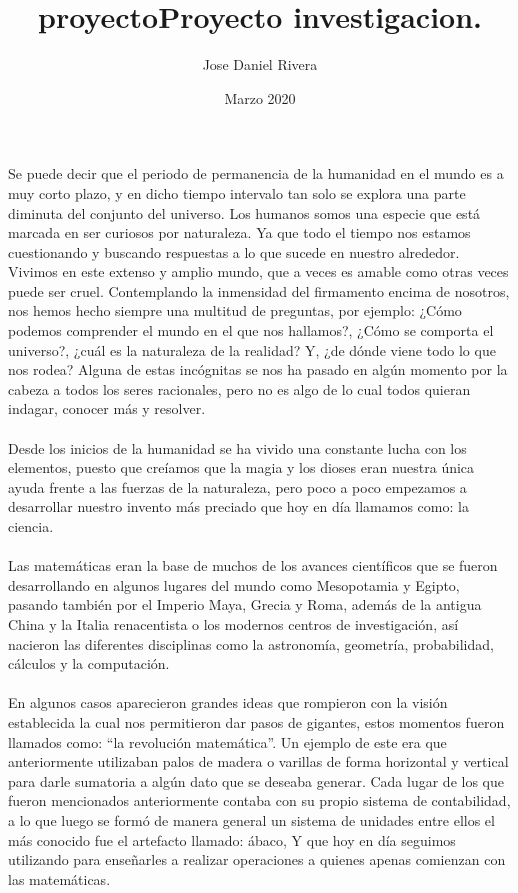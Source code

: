 \documentclass[12pt]{article}
\title{proyecto}
\author{Jose Daniel Rivera }
\date{Marzo 2020}
\begin{document}
\title{Proyecto investigacion. \\}

\maketitle

\noindent
Se puede decir que el periodo de permanencia de la humanidad en el mundo es a muy corto plazo, y en dicho tiempo intervalo tan solo se explora una parte diminuta del conjunto del universo. Los humanos somos una especie que está marcada en ser curiosos por naturaleza. Ya que todo el tiempo nos estamos cuestionando y buscando respuestas a lo que sucede en nuestro alrededor. Vivimos en este extenso y amplio mundo, que a veces es amable como otras veces puede ser cruel.\cite{hawking2010} Contemplando la inmensidad del firmamento encima de nosotros, nos hemos hecho siempre una multitud de preguntas, por ejemplo: ¿Cómo podemos comprender el mundo en el que nos hallamos?, ¿Cómo se comporta el universo?, ¿cuál es la naturaleza de la realidad? Y, ¿de dónde viene todo lo que nos rodea? Alguna de estas incógnitas se nos ha pasado en algún momento por la cabeza a todos los seres racionales, pero no es algo de lo cual todos quieran indagar, conocer más y resolver.\\
\noindent
\\
Desde los inicios de la humanidad se ha vivido una constante lucha con los elementos, puesto que creíamos que la magia y los dioses eran nuestra única ayuda frente a las fuerzas de la naturaleza, pero poco a poco empezamos a desarrollar nuestro invento más preciado que hoy en día llamamos como: la ciencia.\\
\noindent
\\
Las matemáticas eran la base de muchos de los avances científicos que se fueron desarrollando en algunos lugares del mundo como Mesopotamia y Egipto, pasando también por el Imperio Maya, Grecia y Roma, además de la antigua China y la Italia renacentista o los modernos centros de investigación, así nacieron las diferentes disciplinas como la astronomía, geometría, probabilidad, cálculos y la computación.\cite{senovilla2005}\\
\noindent
\\
En algunos casos aparecieron grandes ideas que rompieron con la visión establecida la cual nos permitieron dar pasos de gigantes, estos momentos fueron llamados como: “la revolución matemática”. Un ejemplo de este era que anteriormente utilizaban palos de madera o varillas de forma horizontal y vertical para darle sumatoria a algún dato que se deseaba generar. Cada lugar de los que fueron mencionados anteriormente contaba con su propio sistema de contabilidad, a lo que luego se formó de manera general un sistema de unidades entre ellos el más conocido fue el artefacto llamado: ábaco, Y que hoy en día seguimos utilizando para enseñarles a realizar operaciones a quienes apenas comienzan con las matemáticas.\\
\end{document}
